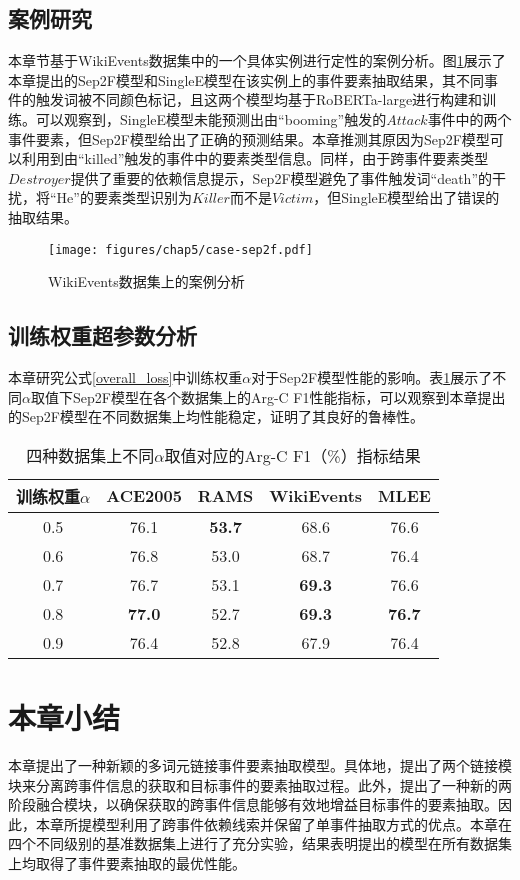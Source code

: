 \subsection{案例研究}
本章节基于WikiEvents数据集中的一个具体实例进行定性的案例分析。图\ref{case-sep2f}展示了本章提出的Sep2F模型和SingleE模型在该实例上的事件要素抽取结果，其不同事件的触发词被不同颜色标记，且这两个模型均基于RoBERTa-large进行构建和训练。可以观察到，SingleE模型未能预测出由“booming”触发的$Attack$事件中的两个事件要素，但Sep2F模型给出了正确的预测结果。本章推测其原因为Sep2F模型可以利用到由“killed”触发的事件中的要素类型信息。同样，由于跨事件要素类型$Destroyer$提供了重要的依赖信息提示，Sep2F模型避免了事件触发词“death”的干扰，将“He”的要素类型识别为$Killer$而不是$Victim$，但SingleE模型给出了错误的抽取结果。

\begin{figure}[htp]
\centering
\texttt{[image: figures/chap5/case-sep2f.pdf]}
\caption{WikiEvents数据集上的案例分析}
\label{case-sep2f}
\end{figure}

\subsection{训练权重超参数分析}
本章研究公式\ref{overall_loss}中训练权重$\alpha$对于Sep2F模型性能的影响。表\ref{alpha_Sep2F}展示了不同$\alpha$取值下Sep2F模型在各个数据集上的Arg-C F1性能指标，可以观察到本章提出的Sep2F模型在不同数据集上均性能稳定，证明了其良好的鲁棒性。

\begin{table}[htp]
\centering
\caption{四种数据集上不同$\alpha$取值对应的Arg-C F1（\%）指标结果}
\begin{tabular}{ccccc}
\toprule
训练权重$\alpha$ & ACE2005 & RAMS & WikiEvents & MLEE \\ \midrule
0.5  & 76.1 & \textbf{53.7} & 68.6 & 76.6 \\
0.6  & 76.8 & 53.0 & 68.7 & 76.4 \\
0.7  & 76.7 & 53.1 & \textbf{69.3} & 76.6 \\
0.8  & \textbf{77.0} & 52.7 & \textbf{69.3} & \textbf{76.7} \\
0.9  & 76.4 & 52.8 & 67.9 & 76.4 \\
\bottomrule
\end{tabular}
\label{alpha_Sep2F}
\end{table}

\section{本章小结}

本章提出了一种新颖的多词元链接事件要素抽取模型。具体地，提出了两个链接模块来分离跨事件信息的获取和目标事件的要素抽取过程。此外，提出了一种新的两阶段融合模块，以确保获取的跨事件信息能够有效地增益目标事件的要素抽取。因此，本章所提模型利用了跨事件依赖线索并保留了单事件抽取方式的优点。本章在四个不同级别的基准数据集上进行了充分实验，结果表明提出的模型在所有数据集上均取得了事件要素抽取的最优性能。